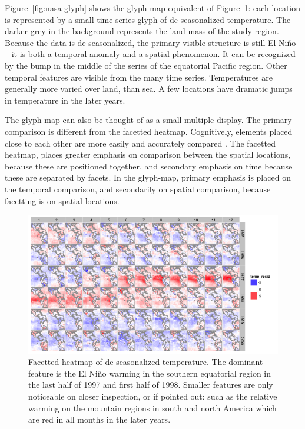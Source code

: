 \documentclass[oneside]{article}
\begin{document}
Figure~\ref{fig:nasa-glyph} shows the glyph-map equivalent of Figure~\ref{fig:nasa-facet}: each location is represented by a small time series glyph of de-seasonalized temperature. The darker grey in the background represents the land mass of the study region. Because the data is de-seasonalized, the primary visible structure is still El Ni\~no -- it is both a temporal anomaly and a spatial phenomenon. It can be recognized by the bump in the middle of the series of the equatorial Pacific region. Other temporal features are visible from the many time series. Temperatures are generally more varied over land, than sea. A few locations have dramatic jumps in temperature in the later years.%

The glyph-map can also be thought of as a small multiple display. The primary comparison is different from the facetted heatmap. Cognitively, elements placed close to each other are more easily and accurately compared \citep{cleveland:1984}. The facetted heatmap, places greater emphasis on comparison between the spatial locations, because these are positioned together, and secondary emphasis on time because these are separated by facets. In the glyph-map, primary emphasis is placed on the temporal comparison, and secondarily on spatial comparison, because facetting is on spatial locations.  


\begin{figure}[htbp]
  \centering
  \includegraphics[width=5.5in]{nasa-colored-map.png}
  \caption{Facetted heatmap of de-seasonalized temperature. The dominant feature is the El Ni\~no warming in the southern equatorial region in the last half of 1997 and first half of 1998. Smaller features are only noticeable on closer inspection, or if pointed out: such as the relative warming on the mountain regions in south and north America which are red in all months in the later years.}
  \label{fig:nasa-facet}
\end{figure}
\end{document}
